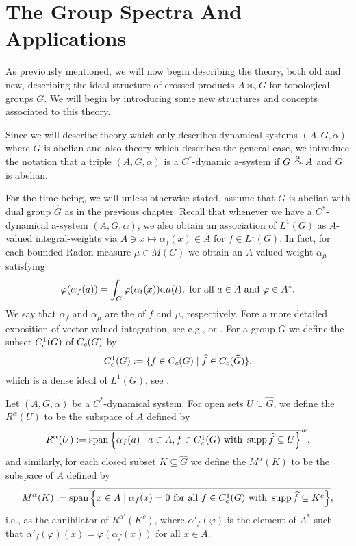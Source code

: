 \chapter{The Group Spectra And Applications}
As previously mentioned, we will now begin describing the theory, both old and new, describing the ideal structure of crossed products $A \rtimes_\alpha G$ for topological groups $G$. We will begin by introducing some new structures and concepts associated to this theory.

Since we will describe theory which only describes dynamical systems $(A,G,\alpha)$ where $G$ is abelian and also theory which describes the general case, we introduce the notation that a triple $(A, G, \alpha)$ is a $C^*$-dynamic a-system if $G \stackrel{\alpha}{\curvearrowright} A$ and $G$ is abelian. 

For the time being, we will unless otherwise stated, assume that $G$ is abelian with dual group $\hat G$ as in the previous chapter. Recall that whenever we have a $C^*$-dynamical a-system $(A, G, \alpha)$, we also obtain an association of $L^1(G)$ as $A$-valued integral-weights via $ A \ni x \mapsto \alpha_f(x) \in A$ for $f \in L^1(G)$. In fact, for each bounded Radon measure $\mu \in M(G)$ we obtain an $A$-valued weight $\alpha_\mu$ satisfying
\begin{align*}
	\varphi(\alpha_f(a)) = \int_G \varphi(\alpha_t(x)) \mathrm{d} \mu(t), \text{ for all } a \in A \text{ and } \varphi \in A^*.
\end{align*}
We say that $\alpha_f$ and $\alpha_\mu$ are the  of $f$ and $\mu$, respectively. Fore a more detailed exposition of vector-valued integration, see e.g., \cite[Appendix 3, Lemma 7.4.4]{pedersenalgauto} or \cite[Appendix A.3]{folland2016fourier}. For a group $G$ we define the subset $C_c^1(G)$ of $C_c(G)$ by
\begin{align*}
	C_c^1(G):= \{ f \in C_c(G) \mid \widehat{f} \in C_c(\widehat{G})\},
\end{align*}
which is a dense ideal of $L^1(G)$, see \cite[Theorem 4.60]{folland2016fourier}.
\begin{definition}
	Let $(A, G, \alpha)$ be a $C^*$-dynamical system. For open sets $U \subseteq \hat G$, we define the  $R^\alpha(U)$ to be the subspace of $A$ defined by
	\begin{align*}
		R^\alpha(U) := \overline{ \mathrm{span} \left\{ \alpha_f(a) \mid a \in A, f \in C_c^1(G) \text{ with } \operatorname{supp} \widehat{f} \subseteq U \right\} }^{w},
	\end{align*}
	and similarly, for each closed subset $K \subseteq \hat G$ we define the  $M^\alpha(K)$ to be the subspace of $A$ defined by
	\begin{align*}
		M^\alpha(K) := \overline{\mathrm{span} \left\{ x \in A \mid \alpha_f(x) = 0 \text{ for all } f \in C_c^1(G) \text{ with } \operatorname{supp} \widehat{f} \subseteq K^c \right\}},
	\end{align*}
	i.e., as the annihilator of $R^{\alpha'}(K^c)$, where $\alpha'_f(\varphi)$ is the element of $A^*$ such that $\alpha'_f(\varphi)(x)=\varphi(\alpha_f(x))$ for all $x \in A$.
\end{definition}

